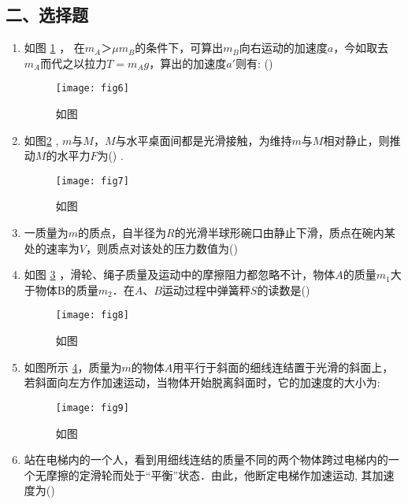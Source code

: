 \subsection*{二、选择题}
\begin{enumerate}
\item 如图 \ref{fig:6} ， 在$m_A＞μm_B$的条件下，可算出$m_B$向右运动的加速度$a$，今如取去$m_A$而代之以拉力$T=m_Ag$，算出的加速度$a′$则有: (\hspace{1pc})
    \begin{figure}[h]
        \centering
        \texttt{[image: fig6]}
        \caption{如图}\label{fig:6}
    \end{figure}
\item 如图\ref{fig:7} , $m$与$M$，$M$与水平桌面间都是光滑接触，为维持$m$与$M$相对静止，则推动$M$的水平力$F$为(\hspace{1pc})
.
    \begin{figure}[h]
        \centering
        \texttt{[image: fig7]}
        \caption{如图}\label{fig:7}
    \end{figure}
\item 一质量为$m$的质点，自半径为$R$的光滑半球形碗口由静止下滑，质点在碗内某处的速率为$V$，则质点对该处的压力数值为(\hspace{1pc})
\item 如图 \ref{fig:8} ，滑轮、绳子质量及运动中的摩擦阻力都忽略不计，物体$A$的质量$m_1$大于物体B的质量$m_2$．在$A$、$B$运动过程中弹簧秤$S$的读数是(\hspace{1pc})
    \begin{figure}[h]
        \centering
        \texttt{[image: fig8]}
        \caption{如图}\label{fig:8}
    \end{figure}

\item 如图所示 \ref{fig:9}，质量为$m$的物体$A$用平行于斜面的细线连结置于光滑的斜面上，若斜面向左方作加速运动，当物体开始脱离斜面时，它的加速度的大小为:
    \begin{figure}[h]
        \centering
        \texttt{[image: fig9]}
        \caption{如图}\label{fig:9}
    \end{figure}
\item 站在电梯内的一个人，看到用细线连结的质量不同的两个物体跨过电梯内的一个无摩擦的定滑轮而处于“平衡”状态．由此，他断定电梯作加速运动, 
其加速度为(\hspace{1pc})
\end{enumerate}


